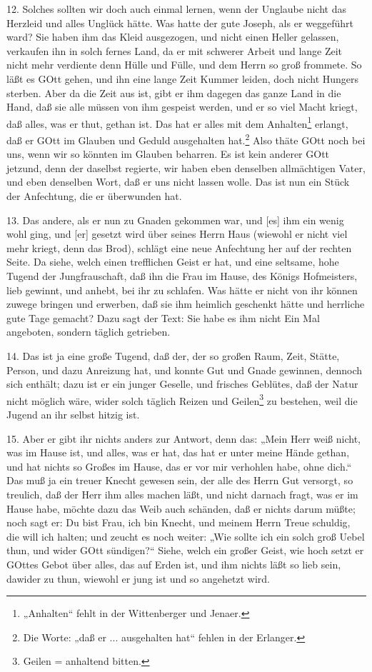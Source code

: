 12. Solches sollten wir doch auch einmal lernen, wenn der Unglaube nicht das Herzleid und alles Unglück hätte. Was hatte der gute Joseph, als er weggeführt ward? Sie haben ihm das Kleid ausgezogen, und nicht einen Heller gelassen, verkaufen ihn in solch fernes Land, da er mit schwerer Arbeit und lange Zeit nicht mehr verdiente denn Hülle und Fülle, und dem Herrn so groß frommete. So läßt es GOtt gehen, und ihn eine lange Zeit Kummer leiden, doch nicht Hungers sterben. Aber da die Zeit aus ist, gibt er ihm dagegen das ganze Land in die Hand, daß sie alle müssen von ihm gespeist werden, und er so viel Macht kriegt, daß alles, was er thut, gethan ist. Das hat er alles mit dem Anhalten\footnote{„Anhalten“ fehlt in der Wittenberger und Jenaer.} erlangt, daß er GOtt im Glauben und Geduld ausgehalten hat.\footnote{Die Worte: „daß er ... ausgehalten hat“ fehlen in der Erlanger.} Also thäte GOtt noch bei uns, wenn wir so könnten im Glauben beharren. Es ist kein anderer GOtt jetzund, denn der daselbst regierte, wir haben eben denselben allmächtigen Vater, und eben denselben Wort, daß er uns nicht lassen wolle. Das ist nun ein Stück der Anfechtung, die er überwunden hat.

13. Das andere, als er nun zu Gnaden gekommen war, und [es] ihm ein wenig wohl ging, und [er] gesetzt wird über seines Herrn Haus (wiewohl er nicht viel mehr kriegt, denn das Brod), schlägt eine neue Anfechtung her auf der rechten Seite. Da siehe, welch einen trefflichen Geist er hat, und eine seltsame, hohe Tugend der Jungfrauschaft, daß ihn die Frau im Hause, des Königs Hofmeisters, lieb gewinnt, und anhebt, bei ihr zu schlafen. Was hätte er nicht von ihr können zuwege bringen und erwerben, daß sie ihm heimlich geschenkt hätte und herrliche gute Tage gemacht? Dazu sagt der Text: Sie habe es ihm nicht Ein Mal angeboten, sondern täglich getrieben.

14. Das ist ja eine große Tugend, daß der, der so großen Raum, Zeit, Stätte, Person, und dazu Anreizung hat, und konnte Gut und Gnade gewinnen, dennoch sich enthält; dazu ist er ein junger Geselle, und frisches Geblütes, daß der Natur nicht möglich wäre, wider solch täglich Reizen und Geilen\footnote{Geilen = anhaltend bitten.} zu bestehen, weil die Jugend an ihr selbst hitzig ist.

15. Aber er gibt ihr nichts anders zur Antwort, denn das: „Mein Herr weiß nicht, was im Hause ist, und alles, was er hat, das hat er unter meine Hände gethan, und hat nichts so Großes im Hause, das er vor mir verhohlen habe, ohne dich.“ Das muß ja ein treuer Knecht gewesen sein, der alle des Herrn Gut versorgt, so treulich, daß der Herr ihm alles machen läßt, und nicht darnach fragt, was er im Hause habe, möchte dazu das Weib auch schänden, daß er nichts darum müßte; noch sagt er: Du bist Frau, ich bin Knecht, und meinem Herrn Treue schuldig, die will ich halten; und zeucht es noch weiter: „Wie sollte ich ein solch groß Uebel thun, und wider GOtt sündigen?“ Siehe, welch ein großer Geist, wie hoch setzt er GOttes Gebot über alles, das auf Erden ist, und ihm nichts läßt so lieb sein, dawider zu thun, wiewohl er jung ist und so angehetzt wird.

